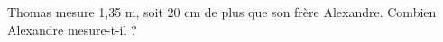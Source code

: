 \documentclass[exercice]{thedocument}%
\begin{document}
%
Thomas mesure 1,35 m, soit 20 cm de plus que son frère Alexandre.\vskip10pt
Combien Alexandre mesure-t-il ?
\end{document}
